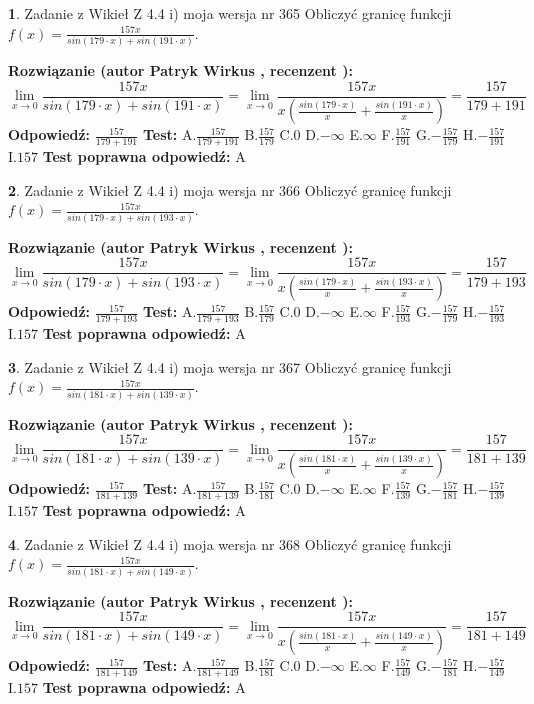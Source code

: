 \documentclass[12pt, a4paper]{article}
\theoremstyle{definition} %
\newtheorem{zad}{}
\newcommand{\zadStart}[1]{\begin{zad}#1\newline}
\newcommand{\zadStop}{\end{zad}}
\newcommand{\rozwStart}[2]{\noindent \textbf{Rozwiązanie (autor #1 , recenzent #2): }\newline}
\newcommand{\rozwStop}{\newline}
\newcommand{\odpStart}{\noindent \textbf{Odpowiedź:}\newline}
\newcommand{\odpStop}{\newline}
\newcommand{\testStart}{\noindent \textbf{Test:}\newline}
\newcommand{\testStop}{\newline}
\newcommand{\kluczStart}{\noindent \textbf{Test poprawna odpowiedź:}\newline}
\newcommand{\kluczStop}{\newline}
\begin{document}
\zadStart{Zadanie z Wikieł Z 4.4 i) moja wersja nr 365}
Obliczyć granicę funkcji $f(x)=\frac{157x}{sin(179\cdot x) +sin(191\cdot x)}$.
\zadStop
\rozwStart{Patryk Wirkus}{}
$$\lim\limits_{x\to 0}\frac{157x}{sin(179\cdot x) +sin(191\cdot x)}=\lim\limits_{x\to 0}\frac{157x}{x(\frac{sin(179\cdot x)}{x}+\frac{sin(191\cdot x)}{x})}=\frac{157}{179+191}$$
\rozwStop
\odpStart
$\frac{157}{179+191}$
\odpStop
\testStart
A.$\frac{157}{179+191}$
B.$\frac{157}{179}$
C.$0$
D.$-\infty$
E.$\infty$
F.$\frac{157}{191}$
G.$-\frac{157}{179}$
H.$-\frac{157}{191}$
I.$157$
\testStop
\kluczStart
A
\kluczStop



\zadStart{Zadanie z Wikieł Z 4.4 i) moja wersja nr 366}
Obliczyć granicę funkcji $f(x)=\frac{157x}{sin(179\cdot x) +sin(193\cdot x)}$.
\zadStop
\rozwStart{Patryk Wirkus}{}
$$\lim\limits_{x\to 0}\frac{157x}{sin(179\cdot x) +sin(193\cdot x)}=\lim\limits_{x\to 0}\frac{157x}{x(\frac{sin(179\cdot x)}{x}+\frac{sin(193\cdot x)}{x})}=\frac{157}{179+193}$$
\rozwStop
\odpStart
$\frac{157}{179+193}$
\odpStop
\testStart
A.$\frac{157}{179+193}$
B.$\frac{157}{179}$
C.$0$
D.$-\infty$
E.$\infty$
F.$\frac{157}{193}$
G.$-\frac{157}{179}$
H.$-\frac{157}{193}$
I.$157$
\testStop
\kluczStart
A
\kluczStop



\zadStart{Zadanie z Wikieł Z 4.4 i) moja wersja nr 367}
Obliczyć granicę funkcji $f(x)=\frac{157x}{sin(181\cdot x) +sin(139\cdot x)}$.
\zadStop
\rozwStart{Patryk Wirkus}{}
$$\lim\limits_{x\to 0}\frac{157x}{sin(181\cdot x) +sin(139\cdot x)}=\lim\limits_{x\to 0}\frac{157x}{x(\frac{sin(181\cdot x)}{x}+\frac{sin(139\cdot x)}{x})}=\frac{157}{181+139}$$
\rozwStop
\odpStart
$\frac{157}{181+139}$
\odpStop
\testStart
A.$\frac{157}{181+139}$
B.$\frac{157}{181}$
C.$0$
D.$-\infty$
E.$\infty$
F.$\frac{157}{139}$
G.$-\frac{157}{181}$
H.$-\frac{157}{139}$
I.$157$
\testStop
\kluczStart
A
\kluczStop



\zadStart{Zadanie z Wikieł Z 4.4 i) moja wersja nr 368}
Obliczyć granicę funkcji $f(x)=\frac{157x}{sin(181\cdot x) +sin(149\cdot x)}$.
\zadStop
\rozwStart{Patryk Wirkus}{}
$$\lim\limits_{x\to 0}\frac{157x}{sin(181\cdot x) +sin(149\cdot x)}=\lim\limits_{x\to 0}\frac{157x}{x(\frac{sin(181\cdot x)}{x}+\frac{sin(149\cdot x)}{x})}=\frac{157}{181+149}$$
\rozwStop
\odpStart
$\frac{157}{181+149}$
\odpStop
\testStart
A.$\frac{157}{181+149}$
B.$\frac{157}{181}$
C.$0$
D.$-\infty$
E.$\infty$
F.$\frac{157}{149}$
G.$-\frac{157}{181}$
H.$-\frac{157}{149}$
I.$157$
\testStop
\kluczStart
A
\kluczStop
\end{document}
